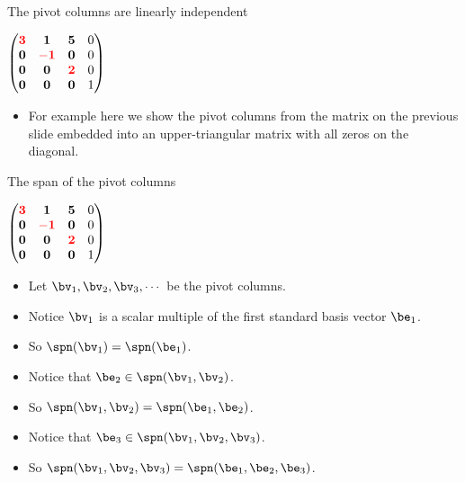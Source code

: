 \documentclass{beamer}
\begin{document}

\begin{frame}{The pivot columns are linearly independent}

$
\begin{pmatrix}
\textcolor{red}{\mathbf{3}} & \mathbf{1}                   & \mathbf{5}                  & 0 \\
\mathbf{0}                  & \textcolor{red}{\mathbf{-1}} & \mathbf{0}                  & 0 \\
\mathbf{0}                  & \mathbf{0}                   & \textcolor{red}{\mathbf{2}} & 0 \\
\mathbf{0}                  & \mathbf{0}                   & \mathbf{0}                  & 1
\end{pmatrix}
$
\begin{itemize}
\item For example here we show the pivot columns from the matrix on the previous slide
embedded into an upper-triangular matrix with all zeros on the diagonal.
\end{itemize}

\end{frame}


\begin{frame}{The span of the pivot columns}

$
\begin{pmatrix}
\textcolor{red}{\mathbf{3}} & \mathbf{1}                   & \mathbf{5}                  & 0 \\
\mathbf{0}                  & \textcolor{red}{\mathbf{-1}} & \mathbf{0}                  & 0 \\
\mathbf{0}                  & \mathbf{0}                   & \textcolor{red}{\mathbf{2}} & 0 \\
\mathbf{0}                  & \mathbf{0}                   & \mathbf{0}                  & 1
\end{pmatrix}
$
\begin{itemize}
\item Let $\bv_1,\bv_2,\bv_3,\cdots$ be the pivot columns.
\item Notice $\bv_1$ is a scalar multiple of the first standard basis vector $\be_1$.
\item So $\spn(\bv_1) = \spn(\be_1)$.
\item Notice that $\be_2\in\spn(\bv_1,\bv_2)$.
\item So $\spn(\bv_1,\bv_2) = \spn(\be_1,\be_2)$.
\item Notice that $\be_3\in\spn(\bv_1,\bv_2,\bv_3)$.
\item So $\spn(\bv_1,\bv_2,\bv_3) = \spn(\be_1,\be_2,\be_3)$.
\end{itemize}

\end{frame}
\end{document}
